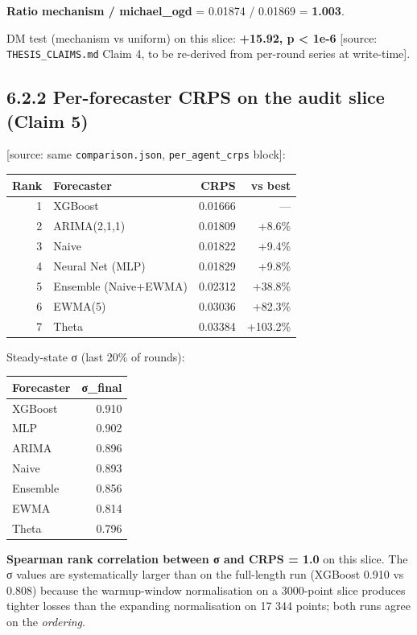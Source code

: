 \documentclass[11pt,a4paper,openany]{report}
\begin{document}
\textbf{Ratio mechanism / michael_ogd} = 0.01874 / 0.01869 = \textbf{1.003}.

DM test (mechanism vs uniform) on this slice: \textbf{+15.92, p < 1e-6}
[source: \texttt{THESIS\_CLAIMS.md} Claim 4, to be re-derived from per-round
series at write-time].

\subsection{6.2.2 Per-forecaster CRPS on the audit slice (Claim 5)}

[source: same \texttt{comparison.json}, \texttt{per\_agent\_crps} block]:

\begin{center}
\small
\begin{tabular}{rlrr}
\toprule
\textbf{Rank} & \textbf{Forecaster} & \textbf{CRPS} & \textbf{vs best} \\
\midrule
1 & XGBoost & 0.01666 & — \\
2 & ARIMA(2,1,1) & 0.01809 & +8.6\% \\
3 & Naive & 0.01822 & +9.4\% \\
4 & Neural Net (MLP) & 0.01829 & +9.8\% \\
5 & Ensemble (Naive+EWMA) & 0.02312 & +38.8\% \\
6 & EWMA(5) & 0.03036 & +82.3\% \\
7 & Theta & 0.03384 & +103.2\% \\
\bottomrule
\end{tabular}
\end{center}

Steady-state σ (last 20\% of rounds):

\begin{center}
\small
\begin{tabular}{lr}
\toprule
\textbf{Forecaster} & \textbf{σ\_final} \\
\midrule
XGBoost & 0.910 \\
MLP & 0.902 \\
ARIMA & 0.896 \\
Naive & 0.893 \\
Ensemble & 0.856 \\
EWMA & 0.814 \\
Theta & 0.796 \\
\bottomrule
\end{tabular}
\end{center}

\textbf{Spearman rank correlation between σ and CRPS = 1.0} on this slice.
The σ values are systematically larger than on the full-length run
(XGBoost 0.910 vs 0.808) because the warmup-window normalisation on a
3000-point slice produces tighter losses than the expanding
normalisation on 17 344 points; both runs agree on the \emph{ordering}.
\end{document}

